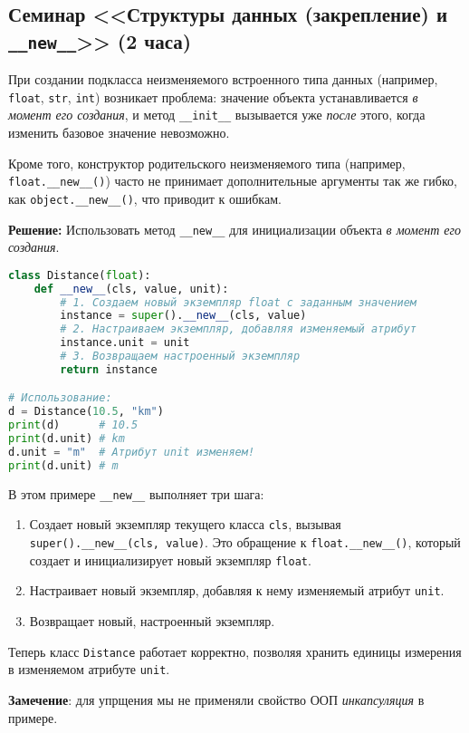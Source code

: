 \subsection{Семинар <<Структуры данных (закрепление) и \texttt{\_\_new\_\_}>>  
(2 часа)}

При создании подкласса неизменяемого встроенного типа данных 
(например, \texttt{float}, \texttt{str}, \texttt{int}) 
возникает проблема: значение объекта 
устанавливается \textit{в момент его создания}, 
и метод \texttt{\_\_init\_\_} вызывается уже 
\textit{после} этого, когда изменить базовое значение невозможно.

Кроме того, конструктор родительского неизменяемого типа 
(например, \texttt{float.\_\_new\_\_()}) часто не принимает 
дополнительные аргументы так же гибко, 
как \texttt{object.\_\_new\_\_()}, что приводит к ошибкам.

\textbf{Решение:} Использовать метод \texttt{\_\_new\_\_} для 
инициализации объекта \textit{в момент его создания}.

\begin{lstlisting}[language=Python, caption=Пример: Класс Distance с использованием \_\_new\_\_]
class Distance(float):
    def __new__(cls, value, unit):
        # 1. Создаем новый экземпляр float с заданным значением
        instance = super().__new__(cls, value)
        # 2. Настраиваем экземпляр, добавляя изменяемый атрибут
        instance.unit = unit
        # 3. Возвращаем настроенный экземпляр
        return instance

# Использование:
d = Distance(10.5, "km")
print(d)      # 10.5
print(d.unit) # km
d.unit = "m"  # Атрибут unit изменяем!
print(d.unit) # m
\end{lstlisting}

В этом примере \texttt{\_\_new\_\_} выполняет три шага:
\begin{enumerate}
    \item Создает новый экземпляр текущего класса \texttt{cls}, вызывая \texttt{super().\_\_new\_\_(cls, value)}. Это обращение к \texttt{float.\_\_new\_\_()}, который создает и инициализирует новый экземпляр \texttt{float}.
    \item Настраивает новый экземпляр, добавляя к нему изменяемый атрибут \texttt{unit}.
    \item Возвращает новый, настроенный экземпляр.
\end{enumerate}

Теперь класс \texttt{Distance} работает корректно, позволяя хранить единицы измерения в изменяемом атрибуте \texttt{unit}.

\textbf{Замечение}: для упрщения мы не применяли свойство ООП 
\textit{инкапсуляция} 
в примере.






